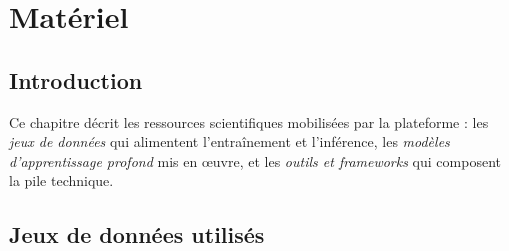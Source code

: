 \documentclass[12pt,a4paper,oneside]{book}
\begin{document}
\chapter{Matériel}
\label{ch:materiel}

\section*{Introduction}
Ce chapitre décrit les ressources scientifiques mobilisées par la
plateforme : les \emph{jeux de données} qui alimentent l'entraînement et
l'inférence, les \emph{modèles d'apprentissage profond} mis en œuvre, et
les \emph{outils et frameworks} qui composent la pile technique.

\section{Jeux de données utilisés}
\label{sec:datasets}
\end{document}
